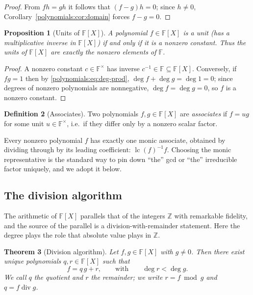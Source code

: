 \documentclass[11pt,a4paper]{article}
\newtheorem{theorem}{Theorem}[section]
\newtheorem{proposition}[theorem]{Proposition}
\theoremstyle{definition}
\newtheorem{definition}[theorem]{Definition}
\theoremstyle{remark}
\newcommand{\Z}{\ensuremath{\mathbb{Z}}}
\newcommand{\F}{\ensuremath{\mathbb{F}}}
\begin{document}
\begin{proof}
From \(fh = gh\) it follows that \((f - g) h = 0\); since \(h \neq 0\),
Corollary~\ref{polynomials:cor:domain} forces \(f - g = 0\).
\end{proof}

\begin{proposition}[{Units of \(\F[X]\)}]\label{polynomials:prop:units}
A polynomial \(f \in \F[X]\) is a \emph{unit} (has a multiplicative inverse in
\(\F[X]\)) if and only if it is a nonzero constant. Thus the units of \(\F[X]\)
are exactly the nonzero elements of \(\F\).
\end{proposition}

\begin{proof}
A nonzero constant \(c \in \F^\times\) has inverse \(c^{-1} \in \F \subseteq
\F[X]\). Conversely, if \(fg = 1\) then by \eqref{polynomials:eq:deg-prod},
\(\deg f + \deg g = \deg 1 = 0\); since degrees of nonzero polynomials are
nonnegative, \(\deg f = \deg g = 0\), so \(f\) is a nonzero constant.
\end{proof}

\begin{definition}[Associates]\label{polynomials:def:associates}
Two polynomials \(f, g \in \F[X]\) are \emph{associates} if \(f = u g\) for some
unit \(u \in \F^\times\), i.e.\ if they differ only by a nonzero scalar factor.
\end{definition}

Every nonzero polynomial \(f\) has exactly one monic associate, obtained by
dividing through by its leading coefficient: \(\operatorname{lc}(f)^{-1} f\).
Choosing the monic representative is the standard way to pin down ``the'' gcd or
``the'' irreducible factor uniquely, and we adopt it below.
\subsection{The division algorithm}
\label{polynomials:subsec:division}

The arithmetic of \(\F[X]\) parallels that of the integers \(\Z\) with remarkable
fidelity, and the source of the parallel is a division-with-remainder statement.
Here the degree plays the role that absolute value plays in \(\Z\).

\begin{theorem}[Division algorithm]\label{polynomials:thm:division}
Let \(f, g \in \F[X]\) with \(g \neq 0\). Then there exist \emph{unique}
polynomials \(q, r \in \F[X]\) such that
\[
  f = q\, g + r,
  \qquad\text{with}\qquad
  \deg r < \deg g.
\]
We call \(q\) the \emph{quotient} and \(r\) the \emph{remainder}; we write
\(r = f \bmod g\) and \(q = f \operatorname{div} g\).
\end{theorem}
\end{document}
